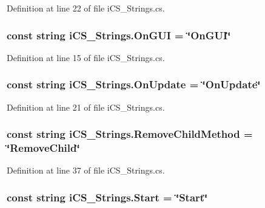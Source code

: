 Definition at line 22 of file i\+C\+S\+\_\+\+Strings.\+cs.

\hypertarget{classi_c_s___strings_a35d20b736be73c19faa689d8053ce527}{
\subsubsection[{On\+G\+U\+I}]{\setlength{\rightskip}{0pt plus 5cm}const string i\+C\+S\+\_\+\+Strings.\+On\+G\+U\+I = \char`\"{}On\+G\+U\+I\char`\"{}}}\label{classi_c_s___strings_a35d20b736be73c19faa689d8053ce527}


Definition at line 15 of file i\+C\+S\+\_\+\+Strings.\+cs.

\hypertarget{classi_c_s___strings_a026218da4467a77c4c3b83c47f7650ae}{
\subsubsection[{On\+Update}]{\setlength{\rightskip}{0pt plus 5cm}const string i\+C\+S\+\_\+\+Strings.\+On\+Update = \char`\"{}On\+Update\char`\"{}}}\label{classi_c_s___strings_a026218da4467a77c4c3b83c47f7650ae}


Definition at line 21 of file i\+C\+S\+\_\+\+Strings.\+cs.

\hypertarget{classi_c_s___strings_a8d3674494ffd847453d56c5b385bc1e5}{
\subsubsection[{Remove\+Child\+Method}]{\setlength{\rightskip}{0pt plus 5cm}const string i\+C\+S\+\_\+\+Strings.\+Remove\+Child\+Method = \char`\"{}Remove\+Child\char`\"{}}}\label{classi_c_s___strings_a8d3674494ffd847453d56c5b385bc1e5}


Definition at line 37 of file i\+C\+S\+\_\+\+Strings.\+cs.

\hypertarget{classi_c_s___strings_ae59ad3850449e1893f6052078f71f72f}{
\subsubsection[{Start}]{\setlength{\rightskip}{0pt plus 5cm}const string i\+C\+S\+\_\+\+Strings.\+Start = \char`\"{}Start\char`\"{}}}\label{classi_c_s___strings_ae59ad3850449e1893f6052078f71f72f}


